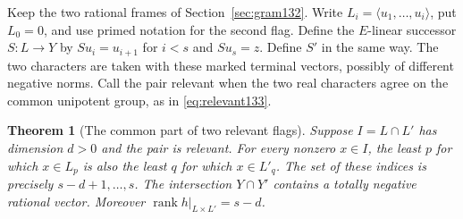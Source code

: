 \documentclass[a4paper,11pt]{article}
\newtheorem{theorem}[proposition]{Theorem}
\theoremstyle{definition}
\theoremstyle{remark}
\numberwithin{equation}{section}
\begin{document}
Keep the two rational frames of Section~\ref{sec:gram132}. Write
\(L_i=\langle u_1,\ldots,u_i\rangle\), put \(L_0=0\), and use
primed notation for the second flag. Define the \(E\)-linear
successor \(S:L\to Y\) by \(Su_i=u_{i+1}\) for \(i<s\) and
\(Su_s=z\). Define \(S'\) in the same way. The two characters
are taken with these marked terminal vectors, possibly of
different negative norms. Call the pair relevant when the two
real characters agree on the common unipotent group, as in
\eqref{eq:relevant133}.

\begin{theorem}[The common part of two relevant flags]
\label{thm:success135}
Suppose \(I=L\cap L'\) has dimension \(d>0\) and the pair is
relevant. For every nonzero \(x\in I\), the least \(p\) for
which \(x\in L_p\) is also the least \(q\) for which \(x\in L'_q\).
The set of these indices is precisely \(s-d+1,\ldots,s\).
The intersection \(Y\cap Y'\) contains a totally negative
rational vector. Moreover \(\operatorname{rank}h|_{L\times L'}
=s-d\).
\end{theorem}
\end{document}

